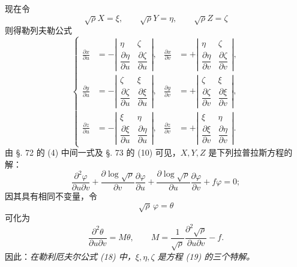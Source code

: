 现在令
\[
 \sqrt\rho X=\xi,
 \qquad
 \sqrt\rho Y=\eta,
 \qquad
 \sqrt\rho Z=\zeta
\]
则得勒列夫勒公式
\begin{equation}\tag{18}
\left\{
\begin{aligned}
\frac{\partial x}{\partial u}&=-\left|\begin{matrix}\eta&\zeta\\[0.25em] \dfrac{\partial\eta}{\partial u}&\dfrac{\partial\zeta}{\partial u}\end{matrix}\right|,
&
\frac{\partial x}{\partial v}&=+\left|\begin{matrix}\eta&\zeta\\[0.25em] \dfrac{\partial\eta}{\partial v}&\dfrac{\partial\zeta}{\partial v}\end{matrix}\right|,\\[0.9em]
\frac{\partial y}{\partial u}&=-\left|\begin{matrix}\zeta&\xi\\[0.25em] \dfrac{\partial\zeta}{\partial u}&\dfrac{\partial\xi}{\partial u}\end{matrix}\right|,
&
\frac{\partial y}{\partial v}&=+\left|\begin{matrix}\zeta&\xi\\[0.25em] \dfrac{\partial\zeta}{\partial v}&\dfrac{\partial\xi}{\partial v}\end{matrix}\right|,\\[0.9em]
\frac{\partial z}{\partial u}&=-\left|\begin{matrix}\xi&\eta\\[0.25em] \dfrac{\partial\xi}{\partial u}&\dfrac{\partial\eta}{\partial u}\end{matrix}\right|,
&
\frac{\partial z}{\partial v}&=+\left|\begin{matrix}\xi&\eta\\[0.25em] \dfrac{\partial\xi}{\partial v}&\dfrac{\partial\eta}{\partial v}\end{matrix}\right|.
\end{aligned}\right.
\end{equation}
由 \S. 72 的 (4) 中间一式及 \S. 73 的 (10) 可见，\(X,Y,Z\) 是下列拉普拉斯方程的解：
\[
 \frac{\partial^2\varphi}{\partial u\partial v}
 +\frac{\partial\log\sqrt\rho}{\partial v}\frac{\partial\varphi}{\partial u}
 +\frac{\partial\log\sqrt\rho}{\partial u}\frac{\partial\varphi}{\partial v}
 +f\varphi=0;
\]
因其具有相同不变量，令
\[
 \sqrt\rho\,\varphi=\theta
\]
可化为
\begin{equation}\tag{19}
 \frac{\partial^2\theta}{\partial u\partial v}=M\theta,
 \qquad
 M=\frac1{\sqrt\rho}\frac{\partial^2\sqrt\rho}{\partial u\partial v}-f.
\end{equation}
因此：\emph{在勒利厄夫尔公式 (18) 中，\(\xi,\eta,\zeta\) 是方程 (19) 的三个特解。}

